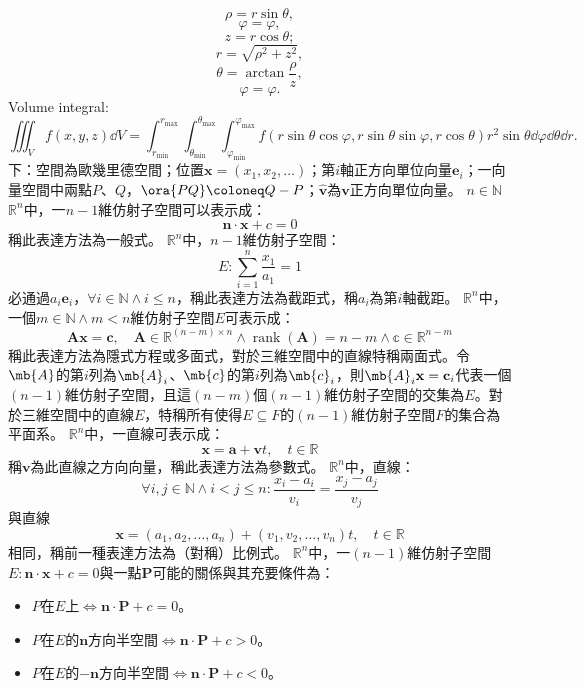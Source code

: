 \documentclass[a4paper,12pt]{report}
\begin{document}
\[\rho=r\sin\theta,\]
\[\varphi=\varphi,\]
\[z=r\cos\theta;\]
\[r=\sqrt{\rho^2+z^2},\]
\[\theta=\arctan\frac{\rho}{z},\]
\[\varphi=\varphi.\]
Volume integral:
\[\iiint_Vf(x,y,z)\dd{V}=\int_{r_\text{min}}^{r_\text{max}}\int_{\theta_\text{min}}^{\theta_\text{max}}\int_{\varphi_\text{min}}^{\varphi_\text{max}}f(r\sin\theta\cos\varphi,r\sin\theta\sin\varphi,r\cos\theta)r^2\sin\theta\dd{\varphi}\dd{\theta}\dd{r}.\]
下：空間為歐幾里德空間；位置$\mathbf{x}=(x_1,x_2,\ldots)$；第$i$軸正方向單位向量$\mathbf{e}_i$；一向量空間中兩點$P$、$Q$，$\ora{PQ}\coloneq Q-P$；$\hat{\mathbf{v}}$為$\mathbf{v}$正方向單位向量。
$n\in\mathbb{N}$
$\mathbb{R}^n$中，一$n-1$維仿射子空間可以表示成：
\[\mathbf{n}\cdot\mathbf{x}+c=0\]
稱此表達方法為一般式。
$\mathbb{R}^n$中，$n-1$維仿射子空間：
\[E\colon\sum_{i=1}^n\frac{x_1}{a_1}=1\]
必通過$a_i\mathbf{e}_i$，$\forall i\in\mathbb{N}\land i\leq n$，稱此表達方法為截距式，稱$a_i$為第$i$軸截距。
$\mathbb{R}^n$中，一個$m\in\mathbb{N}\land m<n$維仿射子空間$E$可表示成：
\[\mathbf{A}\mathbf{x}=\mathbf{c},\quad\mathbf{A}\in\mathbb{R}^{(n-m)\times n}\land\operatorname{rank}(\mathbf{A})=n-m\land\mathbb{c}\in\mathbb{R}^{n-m}\]
稱此表達方法為隱式方程或多面式，對於三維空間中的直線特稱兩面式。令$\mb{A}$的第$i$列為$\mb{A}_i$、$\mb{c}$的第$i$列為$\mb{c}_i$，則$\mb{A}_i\mathbf{x}=\mathbf{c}_i$代表一個$(n-1)$維仿射子空間，且這$(n-m)$個$(n-1)$維仿射子空間的交集為$E$。對於三維空間中的直線$E$，特稱所有使得$E\subseteq F$的$(n-1)$維仿射子空間$F$的集合為平面系。
$\mathbb{R}^n$中，一直線可表示成：
\[\mathbf{x}=\mathbf{a}+\mathbf{v}t,\quad t\in\mathbb{R}\]
稱$\mathbf{v}$為此直線之方向向量，稱此表達方法為參數式。
$\mathbb{R}^n$中，直線：
\[\forall i,j\in\mathbb{N}\land i<j\leq n\colon\frac{x_i-a_i}{v_i}=\frac{x_j-a_j}{v_j}\]
與直線
\[\mathbf{x}=(a_1,a_2,\ldots,a_n)+(v_1,v_2,\ldots,v_n)t,\quad t\in\mathbb{R}\]
相同，稱前一種表達方法為（對稱）比例式。
$\mathbb{R}^n$中，一$(n-1)$維仿射子空間$E\colon\mathbf{n}\cdot\mathbf{x}+c=0$與一點$\mathbf{P}$可能的關係與其充要條件為：
\begin{itemize}
\item $P$在$E$上$\iff\mathbf{n}\cdot\mathbf{P}+c=0$。
\item $P$在$E$的$\mathbf{n}$方向半空間$\iff\mathbf{n}\cdot\mathbf{P}+c>0$。
\item $P$在$E$的$-\mathbf{n}$方向半空間$\iff\mathbf{n}\cdot\mathbf{P}+c<0$。
\end{itemize}
\end{document}
